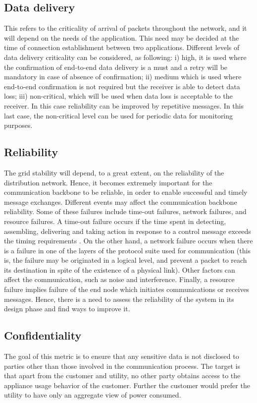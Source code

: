 \documentclass[11pt,draftclsnofoot,onecolumn]{IEEEtran}
\begin{document}
\subsection{Data delivery}
This refers to the criticality of arrival of packets throughout the network, and it will depend on the needs of the application. This need may be decided at the time of connection establishment between two applications. Different levels of data delivery criticality can be considered, as following: i) high, it is used where the confirmation of end-to-end data delivery is a must and a retry will be mandatory in case of absence of confirmation; ii) medium which is used where end-to-end confirmation is not required but the receiver is able to detect data loss; iii) non-critical, which will be used when data loss is acceptable to the receiver. In this case reliability can be improved by repetitive messages. In this last case, the non-critical level can be used for periodic data for monitoring purposes. 

\subsection{Reliability}
The grid stability will depend, to a great extent, on the reliability of the distribution network. Hence, it becomes extremely important for the communication backbone to be reliable, in order to enable successful and timely message exchanges. Different events may affect the communication backbone reliability. Some of these failures include time-out failures, network failures, and resource failures. A time-out failure occurs if the time spent in detecting, assembling, delivering and taking action in response to a control message exceeds the timing requirements \cite{Wang2011a}. On the other hand, a network failure occurs when there is a failure in one of the layers of the protocol suite used for communication (this is, the failure may be originated in a logical level, and prevent a packet to reach its destination in spite of the existence of a physical link). Other factors can affect the communication, such as noise and interference. Finally, a resource failure implies failure of the end node which initiates communications or receives messages. Hence, there is a need to assess the reliability of the system in its design phase and find ways to improve it.

\subsection{Confidentiality}
The goal of this metric is to ensure that any sensitive data is not disclosed to parties other than those involved in the communication process. The target is that apart from the customer and utility, no other party obtains access to the appliance usage behavior of the customer. Further the customer would prefer the utility to have only an aggregate view of power consumed.
\end{document}
